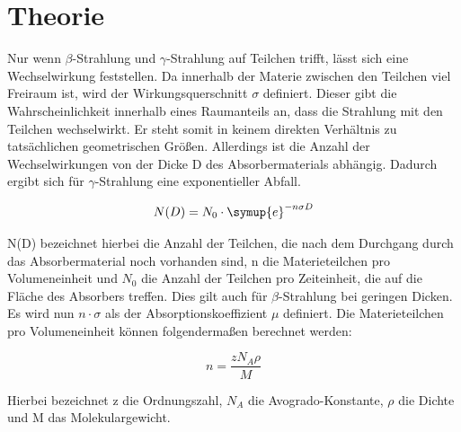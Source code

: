 \section{Theorie}
\label{sec:Theorie}

Nur wenn $\beta$-Strahlung und $\gamma$-Strahlung auf Teilchen trifft, lässt sich eine Wechselwirkung feststellen.
Da innerhalb der Materie zwischen den Teilchen viel Freiraum ist, wird der Wirkungsquerschnitt $\sigma$ definiert.
Dieser gibt die Wahrscheinlichkeit innerhalb eines Raumanteils an, dass die Strahlung mit den Teilchen wechselwirkt.
Er steht somit in keinem direkten Verhältnis zu tatsächlichen geometrischen Größen.
Allerdings ist die Anzahl der Wechselwirkungen von der Dicke D des Absorbermaterials abhängig.
Dadurch ergibt sich für $\gamma$-Strahlung eine exponentieller Abfall.

\begin{equation}
  N(D) = N_0 \cdot \symup{e}^{-n \sigma D}
  \label{eqn:expo}
\end{equation}

N(D) bezeichnet hierbei die Anzahl der Teilchen, die nach dem Durchgang durch das Absorbermaterial noch vorhanden sind, n die Materieteilchen pro Volumeneinheit und $N_0$ die Anzahl der Teilchen pro Zeiteinheit, die auf die Fläche des Absorbers treffen.
Dies gilt auch für $\beta$-Strahlung bei geringen Dicken.
Es wird nun $n \cdot \sigma$ als der Absorptionskoeffizient $\mu$ definiert.
Die Materieteilchen pro Volumeneinheit können folgendermaßen berechnet werden:

\begin{equation}
  n = \frac{z N_A \rho}{M}
\end{equation}

Hierbei bezeichnet z die Ordnungszahl, $N_A$ die Avogrado-Konstante, $\rho$ die Dichte und M das Molekulargewicht.

